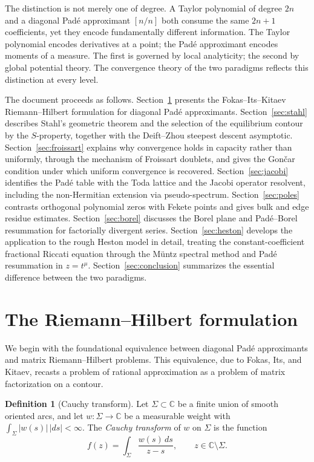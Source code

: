 \documentclass[11pt]{article}
\theoremstyle{definition}
\newtheorem{definition}[theorem]{Definition}
\theoremstyle{remark}
\begin{document}
The distinction is not merely one of degree. A Taylor polynomial of degree $2n$ and a diagonal Pad\'e approximant $[n/n]$ both consume the same $2n+1$ coefficients, yet they encode fundamentally different information. The Taylor polynomial encodes derivatives at a point; the Pad\'e approximant encodes moments of a measure. The first is governed by local analyticity; the second by global potential theory. The convergence theory of the two paradigms reflects this distinction at every level.

The document proceeds as follows. Section~\ref{sec:rhp} presents the Fokas--Its--Kitaev Riemann--Hilbert formulation for diagonal Pad\'e approximants. Section~\ref{sec:stahl} describes Stahl's geometric theorem and the selection of the equilibrium contour by the $S$-property, together with the Deift--Zhou steepest descent asymptotic. Section~\ref{sec:froissart} explains why convergence holds in capacity rather than uniformly, through the mechanism of Froissart doublets, and gives the Gon\v{c}ar condition under which uniform convergence is recovered. Section~\ref{sec:jacobi} identifies the Pad\'e table with the Toda lattice and the Jacobi operator resolvent, including the non-Hermitian extension via pseudo-spectrum. Section~\ref{sec:poles} contrasts orthogonal polynomial zeros with Fekete points and gives bulk and edge residue estimates. Section~\ref{sec:borel} discusses the Borel plane and Pad\'e--Borel resummation for factorially divergent series. Section~\ref{sec:heston} develops the application to the rough Heston model in detail, treating the constant-coefficient fractional Riccati equation through the M\"untz spectral method and Pad\'e resummation in $z = t^{\mu}$. Section~\ref{sec:conclusion} summarizes the essential difference between the two paradigms.

\section{The Riemann--Hilbert formulation}
\label{sec:rhp}

We begin with the foundational equivalence between diagonal Pad\'e approximants and matrix Riemann--Hilbert problems. This equivalence, due to Fokas, Its, and Kitaev, recasts a problem of rational approximation as a problem of matrix factorization on a contour.

\begin{definition}[Cauchy transform]
\label{def:cauchy}
Let $\Sigma\subset\mathbb{C}$ be a finite union of smooth oriented arcs, and let $w:\Sigma\to\mathbb{C}$ be a measurable weight with $\int_{\Sigma}|w(s)|\,|ds|<\infty$. The \emph{Cauchy transform} of $w$ on $\Sigma$ is the function
\begin{equation}
f(z)=\int_{\Sigma}\frac{w(s)\,ds}{z-s},
\qquad z\in\mathbb{C}\setminus\Sigma.
\label{eq:cauchy}
\end{equation}
\end{definition}
\end{document}
